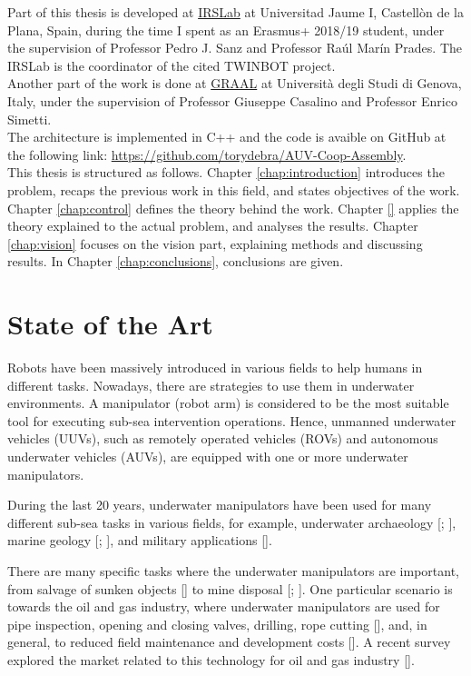 Part of this thesis is developed at \href{http://www.irs.uji.es/}{IRSLab} at Universitad Jaume I, Castell\`{o}n de la Plana, Spain, during the time I spent as an Erasmus+ 2018/19 student, under the supervision of Professor Pedro J. Sanz and Professor Ra\'{u}l Mar\'{i}n Prades. The IRSLab is the coordinator of the cited TWINBOT project. \\
Another part of the work is done at \href{http://www.graal.dibris.unige.it/}{GRAAL} at Universit\`{a} degli Studi di Genova, Italy, under the supervision of Professor Giuseppe Casalino and Professor Enrico Simetti.\\

The architecture is implemented in C++ and the code is avaible on GitHub at the following link:  \href{https://github.com/torydebra/AUV-Coop-Assembly}{https://github.com/torydebra/AUV-Coop-Assembly}.\\

This thesis is structured as follows. Chapter \ref{chap:introduction} introduces the problem, recaps the previous work in this field, and states objectives of the work. Chapter \ref{chap:control} defines the theory behind the work. Chapter \ref{} applies the theory explained to the actual problem, and analyses the results. Chapter \ref{chap:vision} focuses on the vision part, explaining methods and discussing results. In Chapter \ref{chap:conclusions}, conclusions are given.

\section{State of the Art}
\label{sec:stateArt}
Robots have been massively introduced in various fields to help humans in different tasks. Nowadays, there are strategies to use them in underwater environments. A manipulator (robot arm) is considered to be the most suitable tool for executing sub-sea intervention operations. Hence, unmanned underwater vehicles (UUVs), such as remotely operated vehicles (ROVs) and autonomous underwater vehicles (AUVs), are equipped with one or more underwater manipulators.

During the last 20 years, underwater manipulators have been used for many different sub-sea tasks in various fields, for example, underwater archaeology [\cite{IntroApp4}; \cite{IntroApp3}], marine geology [\cite{IntroApp1}; \cite{IntroApp2}], and military applications [\cite{IntroApp5}].

There are many specific tasks where the underwater manipulators are important, from salvage of sunken objects [\cite{IntroSpecApp1}] to mine disposal [\cite{IntroSpecApp2}; \cite{IntroSpecApp3}]. One particular scenario is towards the oil and gas industry, where underwater manipulators are used for pipe inspection, opening and closing valves, drilling, rope cutting [\cite{IntroSpecApp4}], and, in general, to reduced field maintenance and development costs [\cite{IntroSpecApp5}]. A recent survey explored the market related to this technology for oil and gas industry [\cite{IntroSpecApp6}].

